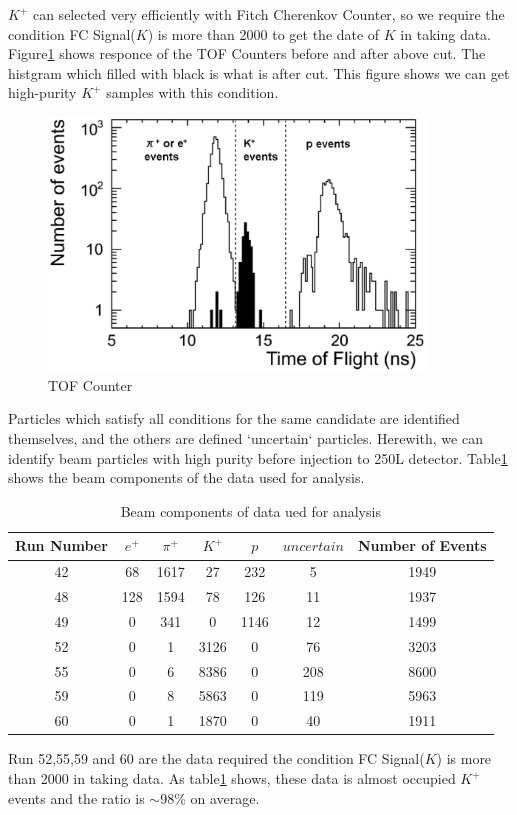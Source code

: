$K^{+}$ can selected very efficiently with Fitch Cherenkov Counter,
so we require the condition FC Signal($K$) is more than 2000
to get the date of $K$ in taking data.
Figure\ref{fig:TOF_cut} shows responce of the TOF Counters before and after above cut.
The histgram which filled with black is what is after cut.
This figure shows we can get high-purity $K^{+}$ samples with this condition.

\begin{figure}[htbp]
  \centering
  \includegraphics[width=10cm,clip]{fig/TOF_cut.eps}
  \caption{TOF Counter}
  \label{fig:TOF_cut}
\end{figure}

Particles which satisfy all conditions for the same candidate are identified themselves, and the others are defined `uncertain` particles.
Herewith, we can identify beam particles with high purity before injection to 250L detector.
Table\ref{tb:component} shows the beam components of the data used for analysis.\\

\begin{table}
  \centering
  \begin{tabular}[htb]{ccccccc}\hline
    Run Number    & $e^{+}$ & $\pi^{+}$ & $K^{+}$ & $p$   & $uncertain$ & Number of Events \\ \hline
    42            & 68      & 1617      & 27      & 232   & 5           & 1949             \\
    48            & 128     & 1594      & 78      & 126   & 11          & 1937             \\
    49            & 0       & 341       & 0       & 1146  & 12          & 1499             \\
    52            & 0       & 1         & 3126    & 0     & 76          & 3203             \\
    55            & 0       & 6         & 8386    & 0     & 208         & 8600             \\
    59            & 0       & 8         & 5863    & 0     & 119         & 5963             \\
    60            & 0       & 1         & 1870    & 0     & 40          & 1911             \\ \hline
  \end{tabular}
  \label{tb:component}
  \caption{Beam components of data ued for analysis}
\end{table}

Run 52,55,59 and 60 are the data required the condition FC Signal($K$) is more than 2000 in taking data.
As table\ref{tb:component} shows, these data is almost occupied $K^{+}$ events and the ratio is $\sim$98\% on average.
